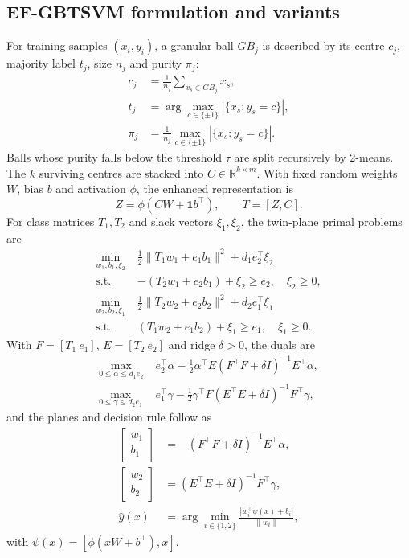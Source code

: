 \documentclass[final,5p,times,twocolumn]{elsarticle}
\begin{document}
\subsection{EF-GBTSVM formulation and variants}\label{sec:formulation}
For training samples $(x_i,y_i)$, a granular ball $GB_j$ is described by its centre $c_j$, majority label $t_j$, size $n_j$ and purity $\pi_j$:
\begin{equation}\begin{aligned}c_j&=\frac{1}{n_j}\sum_{x_s\in GB_j}x_s,\\t_j&=\arg\max_{c\in\{\pm1\}}|\{x_s:y_s=c\}|,\\\pi_j&=\frac{1}{n_j}\max_{c\in\{\pm1\}}|\{x_s:y_s=c\}|.\end{aligned}\end{equation}
Balls whose purity falls below the threshold $\tau$ are split recursively by 2-means. The $k$ surviving centres are stacked into $C\in\mathbb{R}^{k\times m}$. With fixed random weights $W$, bias $b$ and activation $\phi$, the enhanced representation is
\begin{equation}Z=\phi(CW+\mathbf{1}b^\top),\qquad T=[Z,C].\end{equation}
For class matrices $T_1,T_2$ and slack vectors $\xi_1,\xi_2$, the twin-plane primal problems are
\begin{align}\min_{w_1,b_1,\xi_2}\;&\tfrac12\|T_1w_1+e_1b_1\|^2+d_1e_2^\top\xi_2\\\text{s.t. }&-(T_2w_1+e_2b_1)+\xi_2\ge e_2,\quad\xi_2\ge0,\\\min_{w_2,b_2,\xi_1}\;&\tfrac12\|T_2w_2+e_2b_2\|^2+d_2e_1^\top\xi_1\\\text{s.t. }&(T_1w_2+e_1b_2)+\xi_1\ge e_1,\quad\xi_1\ge0.\end{align}
With $F=[T_1\ e_1]$, $E=[T_2\ e_2]$ and ridge $\delta>0$, the duals are
\begin{align}\max_{0\le\alpha\le d_1e_2}\;&e_2^\top\alpha-\tfrac12\alpha^\top E(F^\top F+\delta I)^{-1}E^\top\alpha,\\\max_{0\le\gamma\le d_2e_1}\;&e_1^\top\gamma-\tfrac12\gamma^\top F(E^\top E+\delta I)^{-1}F^\top\gamma,\end{align}
and the planes and decision rule follow as
\begin{equation}\begin{aligned}\begin{bmatrix}w_1\\b_1\end{bmatrix}&=-(F^\top F+\delta I)^{-1}E^\top\alpha,\\\begin{bmatrix}w_2\\b_2\end{bmatrix}&=(E^\top E+\delta I)^{-1}F^\top\gamma,\\\hat y(x)&=\arg\min_{i\in\{1,2\}}\frac{|w_i^\top\psi(x)+b_i|}{\|w_i\|},\end{aligned}\end{equation}
with $\psi(x)=[\phi(xW+b^\top),x]$.
\end{document}
